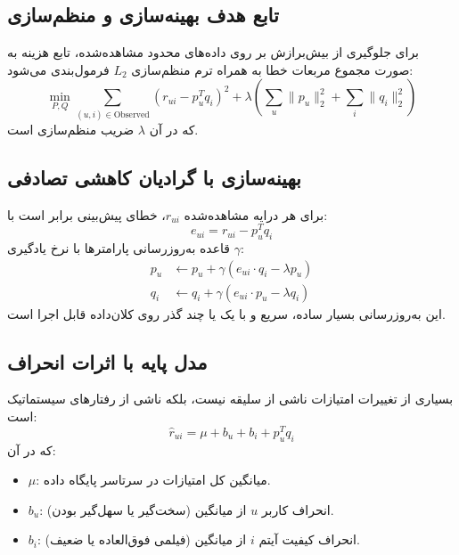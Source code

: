 \subsection{تابع هدف بهینه‌سازی و منظم‌سازی \texorpdfstring{}{(Regularization)}}
برای جلوگیری از بیش‌برازش بر روی داده‌های محدود مشاهده‌شده، تابع هزینه به صورت مجموع مربعات خطا به همراه ترم منظم‌سازی $L_2$ فرمول‌بندی می‌شود:
\begin{equation}
\min_{P, Q} \sum_{(u, i) \in \text{Observed}} (r_{ui} - p_u^T q_i)^2 + \lambda \left( \sum_u \|p_u\|_2^2 + \sum_i \|q_i\|_2^2 \right)
\end{equation}
که در آن $\lambda$ ضریب منظم‌سازی است.

\subsection{بهینه‌سازی با گرادیان کاهشی تصادفی \texorpdfstring{}{(SGD)}}
برای هر درایه مشاهده‌شده $r_{ui}$، خطای پیش‌بینی برابر است با:
\begin{equation}
e_{ui} = r_{ui} - p_u^T q_i
\end{equation}
قاعده به‌روزرسانی پارامترها با نرخ یادگیری $\gamma$:
\begin{align}
p_u &\leftarrow p_u + \gamma (e_{ui} \cdot q_i - \lambda p_u) \\
q_i &\leftarrow q_i + \gamma (e_{ui} \cdot p_u - \lambda q_i)
\end{align}
این به‌روزرسانی بسیار ساده، سریع و با یک یا چند گذر روی کلان‌داده قابل اجرا است.

\subsection{مدل پایه با اثرات انحراف \texorpdfstring{}{(Baseline Predictors)}}
بسیاری از تغییرات امتیازات ناشی از سلیقه نیست، بلکه ناشی از رفتارهای سیستماتیک است:
\begin{equation}
\hat{r}_{ui} = \mu + b_u + b_i + p_u^T q_i
\end{equation}
که در آن:
\begin{itemize}
    \item $\mu$: میانگین کل امتیازات در سرتاسر پایگاه داده.
    \item $b_u$: انحراف کاربر $u$ از میانگین (سخت‌گیر یا سهل‌گیر بودن).
    \item $b_i$: انحراف کیفیت آیتم $i$ از میانگین (فیلمی فوق‌العاده یا ضعیف).
\end{itemize}

